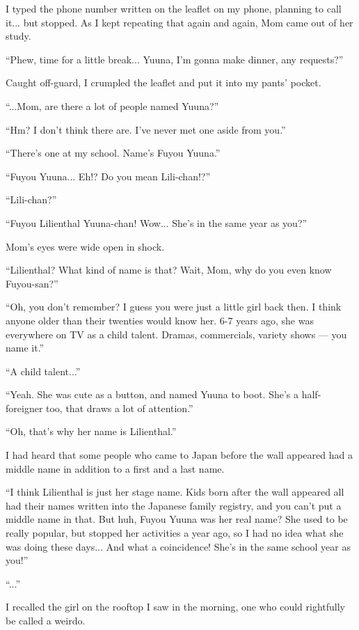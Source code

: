 I typed the phone number written on the leaflet on my phone, planning to call it... but stopped. As I kept repeating that again and again, Mom came out of her study.

``Phew, time for a little break... Yuuna, I'm gonna make dinner, any requests?''

Caught off-guard, I crumpled the leaflet and put it into my pants' pocket.

``...Mom, are there a lot of people named Yuuna?''

``Hm? I don't think there are. I've never met one aside from you.''

``There's one at my school. Name's Fuyou Yuuna.''

``Fuyou Yuuna... Eh!? Do you mean Lili-chan!?''

``Lili-chan?''

``Fuyou Lilienthal Yuuna-chan! Wow... She's in the same year as you?''

Mom's eyes were wide open in shock.

``Lilienthal? What kind of name is that? Wait, Mom, why do you even know Fuyou-san?''

``Oh, you don't remember? I guess you were just a little girl back then. I think anyone older than their twenties would know her. 6-7 years ago, she was everywhere on TV as a child talent. Dramas, commercials, variety shows --- you name it.''

``A child talent...''

``Yeah. She was cute as a button, and named Yuuna to boot. She's a half-foreigner too, that draws a lot of attention.''

``Oh, that's why her name is Lilienthal.''

I had heard that some people who came to Japan before the wall appeared had a middle name in addition to a first and a last name.

``I think Lilienthal is just her stage name. Kids born after the wall appeared all had their names written into the Japanese family registry, and you can't put a middle name in that. But huh, Fuyou Yuuna was her real name? She used to be really popular, but stopped her activities a year ago, so I had no idea what she was doing these days... And what a coincidence! She's in the same school year as you!''

``...''

I recalled the girl on the rooftop I saw in the morning, one who could rightfully be called a weirdo.

